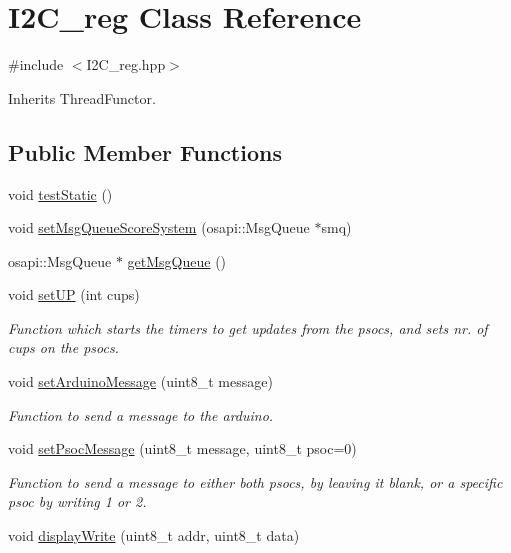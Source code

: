 \hypertarget{class_i2_c__reg}{}\section{I2\+C\+\_\+reg Class Reference}
\label{class_i2_c__reg}


{\ttfamily \#include $<$I2\+C\+\_\+reg.\+hpp$>$}



Inherits Thread\+Functor.

\subsection*{Public Member Functions}
\begin{DoxyCompactItemize}
\item 
void \hyperlink{class_i2_c__reg_a3d471f20191b5918283fefca5d48e0e6}{test\+Static} ()
\item 
void \hyperlink{class_i2_c__reg_a2893302d924b666bd1a91a4effe5ed9b}{set\+Msg\+Queue\+Score\+System} (osapi\+::\+Msg\+Queue $\ast$smq)
\item 
osapi\+::\+Msg\+Queue $\ast$ \hyperlink{class_i2_c__reg_aa0db20b76ba93e31051be9f35ae7ee7e}{get\+Msg\+Queue} ()
\item 
void \hyperlink{class_i2_c__reg_a2028790c3222d6ce7ae263b26919af20}{set\+UP} (int cups)
\begin{DoxyCompactList}\small\item\em Function which starts the timers to get updates from the psocs, and sets nr. of cups on the psocs. \end{DoxyCompactList}\item 
void \hyperlink{class_i2_c__reg_accde84779d1a3a3290fb955c1269b66f}{set\+Arduino\+Message} (uint8\+\_\+t message)
\begin{DoxyCompactList}\small\item\em Function to send a message to the arduino. \end{DoxyCompactList}\item 
void \hyperlink{class_i2_c__reg_a97310205f1e1fc2f53c43ac95c04d252}{set\+Psoc\+Message} (uint8\+\_\+t message, uint8\+\_\+t psoc=0)
\begin{DoxyCompactList}\small\item\em Function to send a message to either both psocs, by leaving it blank, or a specific psoc by writing 1 or 2. \end{DoxyCompactList}\item 
void \hyperlink{class_i2_c__reg_ad9bdd59728a4323f871d0790044e7ac0}{display\+Write} (uint8\+\_\+t addr, uint8\+\_\+t data)

\end{DoxyCompactItemize}
